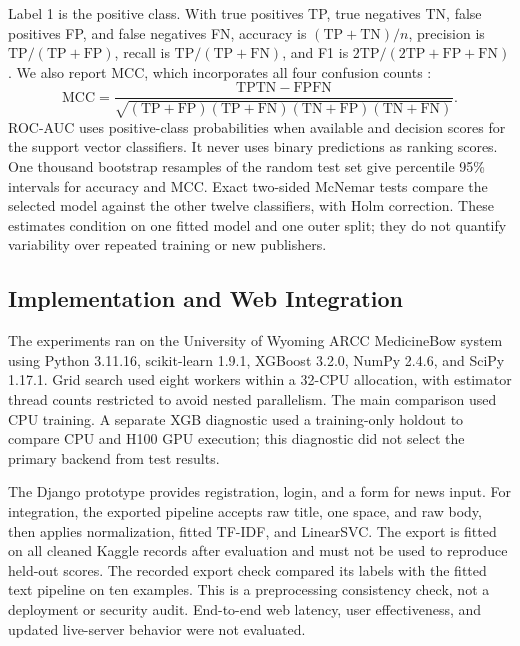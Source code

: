 \documentclass[conference]{IEEEtran}
\begin{document}
Label 1 is the positive class. With true positives TP, true negatives TN, false positives FP, and false negatives FN, accuracy is $(\mathrm{TP}+\mathrm{TN})/n$, precision is $\mathrm{TP}/(\mathrm{TP}+\mathrm{FP})$, recall is $\mathrm{TP}/(\mathrm{TP}+\mathrm{FN})$, and F1 is $2\mathrm{TP}/(2\mathrm{TP}+\mathrm{FP}+\mathrm{FN})$. We also report MCC, which incorporates all four confusion counts \cite{chicco}:
\begin{equation}
\mathrm{MCC}=\frac{\mathrm{TP}\mathrm{TN}-\mathrm{FP}\mathrm{FN}}
{\sqrt{(\mathrm{TP}+\mathrm{FP})(\mathrm{TP}+\mathrm{FN})(\mathrm{TN}+\mathrm{FP})(\mathrm{TN}+\mathrm{FN})}}.
\label{eq:mcc}
\end{equation}
ROC-AUC uses positive-class probabilities when available and decision scores for the support vector classifiers. It never uses binary predictions as ranking scores. One thousand bootstrap resamples of the random test set give percentile 95\% intervals for accuracy and MCC. Exact two-sided McNemar tests compare the selected model against the other twelve classifiers, with Holm correction. These estimates condition on one fitted model and one outer split; they do not quantify variability over repeated training or new publishers.

\subsection{Implementation and Web Integration}
The experiments ran on the University of Wyoming ARCC MedicineBow system using Python 3.11.16, scikit-learn 1.9.1, XGBoost 3.2.0, NumPy 2.4.6, and SciPy 1.17.1. Grid search used eight workers within a 32-CPU allocation, with estimator thread counts restricted to avoid nested parallelism. The main comparison used CPU training. A separate XGB diagnostic used a training-only holdout to compare CPU and H100 GPU execution; this diagnostic did not select the primary backend from test results.

The Django prototype provides registration, login, and a form for news input. For integration, the exported pipeline accepts raw title, one space, and raw body, then applies normalization, fitted TF-IDF, and LinearSVC. The export is fitted on all cleaned Kaggle records after evaluation and must not be used to reproduce held-out scores. The recorded export check compared its labels with the fitted text pipeline on ten examples. This is a preprocessing consistency check, not a deployment or security audit. End-to-end web latency, user effectiveness, and updated live-server behavior were not evaluated.
\end{document}
